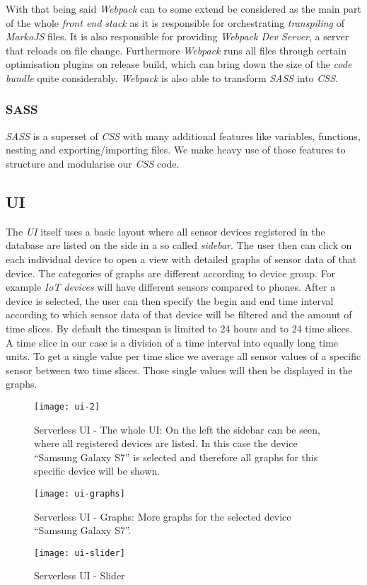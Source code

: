 With that being said \textit{Webpack} can to some extend be considered as the main part of the whole
\textit{front end stack} as it is responsible for orchestrating \textit{transpiling} of
\textit{MarkoJS} files. It is also responsible for providing \textit{Webpack Dev Server}, a server
that reloads on file change. Furthermore \textit{Webpack} runs all files through certain
optimisation plugins on release build, which can bring down the size of the \textit{code bundle}
quite considerably. \textit{Webpack} is also able to transform \textit{SASS} into \textit{CSS}.

\subsubsection{SASS}

\textit{SASS} is a superset of \textit{CSS} with many additional features like variables, functions,
nesting and exporting/importing files. We make heavy use of those features to structure and
modularise our \textit{CSS} code.

\subsection{UI}

The \textit{UI} itself uses a basic layout where all sensor devices registered in the database are
listed on the side in a so called \textit{sidebar}. The user then can click on each individual
device to open a view with detailed graphs of sensor data of that device. The categories of graphs
are different according to device group. For example \textit{IoT devices} will have different
sensors compared to phones. After a device is selected, the user can then specify the begin and end
time interval according to which sensor data of that device will be filtered and the amount of time
slices. By default the timespan is limited to 24 hours and to 24 time slices. A time slice in our
case is a division of a time interval into equally long time units. To get a single value per time
slice we average all sensor values of a specific sensor between two time slices. Those single values
will then be displayed in the graphs.

\begin{figure}[H]
  \centering
  \texttt{[image: ui-2]}
  \caption{Serverless UI - The whole UI: On the left the sidebar can be seen, where all registered devices are listed. In this case the device “Samsung Galaxy S7” is selected and therefore all graphs for this specific device will be shown. }
\end{figure}

\begin{figure}[H]
  \centering
  \texttt{[image: ui-graphs]}
  \caption{Serverless UI - Graphs: More graphs for the selected device “Samsung Galaxy S7”.}
\end{figure}

\begin{figure}[H]
  \centering
  \texttt{[image: ui-slider]}
  \caption{Serverless UI - Slider}
\end{figure}
